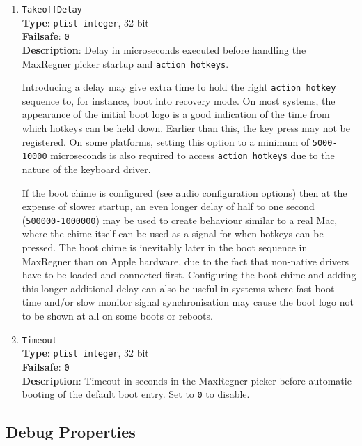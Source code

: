 \documentclass[]{article}
\begin{document}
\begin{enumerate}
\item
  \texttt{TakeoffDelay}\\
  \textbf{Type}: \texttt{plist\ integer}, 32 bit\\
  \textbf{Failsafe}: \texttt{0}\\
  \textbf{Description}: Delay in microseconds executed before handling
  the MaxRegner picker startup and \texttt{action hotkeys}.

  Introducing a delay may give extra time to hold the right \texttt{action hotkey}
  sequence to, for instance, boot into recovery mode. On most systems, the appearance
  of the initial boot logo is a good indication of the time from which hotkeys can be
  held down. Earlier than this, the key press may not be registered. On some platforms,
  setting this option to a minimum of \texttt{5000-10000} microseconds is also required
  to access \texttt{action hotkeys} due to the nature of the keyboard driver.

  If the boot chime is configured (see audio configuration options) then at the expense
  of slower startup, an even longer delay of half to one second (\texttt{500000-1000000})
  may be used to create behaviour similar to a real Mac, where the chime itself can be used
  as a signal for when hotkeys can be pressed. The boot chime is inevitably later in the boot
  sequence in MaxRegner than on Apple hardware, due to the fact that non-native drivers
  have to be loaded and connected first. Configuring the boot chime and adding this longer
  additional delay can also be useful in systems where fast boot time and/or slow monitor signal
  synchronisation may cause the boot logo not to be shown at all on some boots or reboots.

\item
  \texttt{Timeout}\\
  \textbf{Type}: \texttt{plist\ integer}, 32 bit\\
  \textbf{Failsafe}: \texttt{0}\\
  \textbf{Description}: Timeout in seconds in the MaxRegner picker before
  automatic booting of the default boot entry. Set to \texttt{0} to disable.

\end{enumerate}

\subsection{Debug Properties}\label{miscdebugprops}
\end{document}

